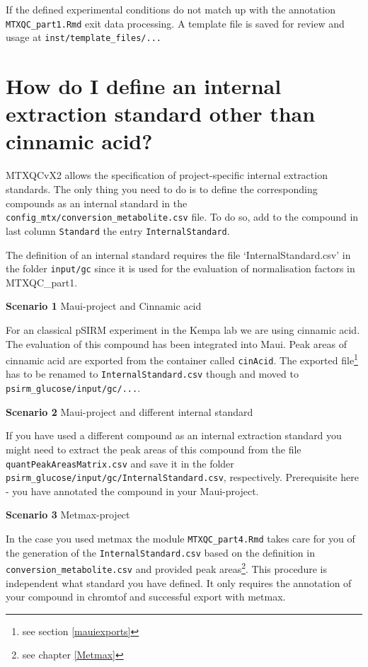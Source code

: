 \documentclass[]{book}
\let\rmarkdownfootnote\footnote%
\def\footnote{\protect\rmarkdownfootnote}
\begin{document}
If the defined experimental conditions do not match up with the annotation \texttt{MTXQC\_part1.Rmd} exit data processing. A template file is saved for review and usage at \texttt{inst/template\_files/...}

\hypertarget{definternal}{%
\section{How do I define an internal extraction standard other than cinnamic acid?}\label{definternal}}

MTXQCvX2 allows the specification of project-specific internal extraction standards. The only thing you need to do is to define the corresponding compounds as an internal standard in the \texttt{config\_mtx/conversion\_metabolite.csv} file. To do so, add to the compound in last column \texttt{Standard} the entry \texttt{InternalStandard}.

The definition of an internal standard requires the file `InternalStandard.csv' in the folder \texttt{input/gc} since it is used for the evaluation of normalisation factors in MTXQC\_part1.

\textbf{Scenario 1} Maui-project and Cinnamic acid

For an classical pSIRM experiment in the Kempa lab we are using cinnamic acid. The evaluation of this compound has been integrated into Maui. Peak areas of cinnamic acid are exported from the container called \texttt{cinAcid}. The exported file\footnote{see section \ref{mauiexports}} has to be renamed to \texttt{InternalStandard.csv} though and moved to \texttt{psirm\_glucose/input/gc/...}.

\textbf{Scenario 2} Maui-project and different internal standard

If you have used a different compound as an internal extraction standard you might need to extract the peak areas of this compound from the file \texttt{quantPeakAreasMatrix.csv} and save it in the folder \texttt{psirm\_glucose/input/gc/InternalStandard.csv}, respectively. Prerequisite here - you have annotated the compound in your Maui-project.

\textbf{Scenario 3} Metmax-project

In the case you used metmax the module \texttt{MTXQC\_part4.Rmd} takes care for you of the generation of the \texttt{InternalStandard.csv} based on the definition in \texttt{conversion\_metabolite.csv} and provided peak areas\footnote{see chapter \ref{Metmax}}.
This procedure is independent what standard you have defined. It only requires the annotation of your compound in chromtof and successful export with metmax.
\end{document}
